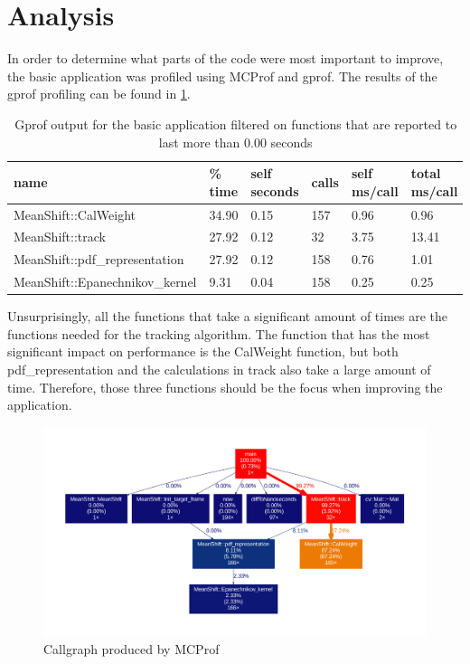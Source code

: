 \documentclass[final]{article}
\begin{document}
\section{Analysis}
In order to determine what parts of the code were most important to improve, the basic application was profiled using MCProf and gprof. The results of the gprof profiling can be found in \cref{tab:gprof}.

\begin{table}[H]
\centering
\caption{Gprof output for the basic application filtered on functions that are reported to last more than 0.00 seconds}
\label{tab:gprof}
\begin{tabular}{llllll}
\toprule
\textbf{name} & \textbf{\% time} & \textbf{self seconds} & \textbf{calls} &  \textbf{self ms/call} & \textbf{total ms/call} \\
\midrule
MeanShift::CalWeight & 34.90   &   0.15  &    157&     0.96 &    0.96  \\
MeanShift::track & 27.92    &   0.12   &    32 &    3.75  &  13.41 \\
MeanShift::pdf\_representation & 27.92     &  0.12    &  158  &   0.76   &  1.01  \\
MeanShift::Epanechnikov\_kernel & 9.31      &   0.04     & 158   &  0.25    & 0.25  \\
\bottomrule
\end{tabular}
\end{table}

Unsurprisingly, all the functions that take a significant amount of times are the functions needed for the tracking algorithm. The function that has the most significant impact on performance is the CalWeight function, but both pdf\_representation and the calculations in track also take a large amount of time. Therefore, those three functions should be the focus when improving the application.

\begin{figure}[H]
\includegraphics[width=\textwidth]{resources/callgraphAll.pdf}
\caption{Callgraph produced by MCProf}
\label{fig:callgraph}
\end{figure}
\end{document}
